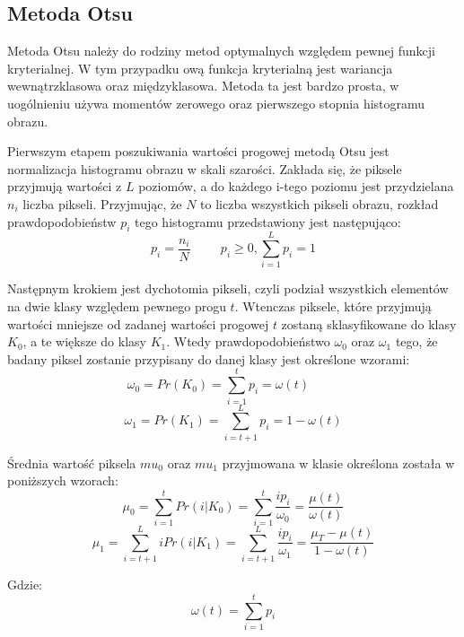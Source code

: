 \documentclass[eng,oneside]{mgr}
\begin{document}
\subsection{Metoda Otsu} 
Metoda Otsu należy do rodziny metod optymalnych względem pewnej funkcji kryterialnej. W tym przypadku ową funkcja kryterialną jest wariancja wewnątrzklasowa oraz międzyklasowa. Metoda ta jest bardzo prosta, w uogólnieniu używa momentów zerowego oraz pierwszego stopnia histogramu obrazu.
\par Pierwszym etapem poszukiwania wartości progowej metodą Otsu jest normalizacja histogramu obrazu w skali szarości. Zakłada się, że piksele przyjmują wartości z $L$ poziomów, a do każdego i-tego poziomu jest przydzielana $n_i$ liczba pikseli. Przyjmując, że $N$ to liczba wszystkich pikseli obrazu, rozkład prawdopodobieństw $p_i$ tego histogramu przedstawiony jest następująco:
\begin{equation}
 p_i = \frac{n_i}{N} \hspace{1cm}
 p_i \geq 0, \sum_{i=1}^L p_i = 1 
\end{equation}
\par Następnym krokiem jest dychotomia pikseli, czyli podział wszystkich elementów na dwie klasy względem pewnego progu $t$. Wtenczas piksele, które przyjmują wartości mniejsze od zadanej wartości progowej $t$ zostaną sklasyfikowane do klasy $K_0$, a te większe do klasy $K_1$. Wtedy prawdopodobieństwo $\omega_0$ oraz $\omega_1$ tego, że badany piksel zostanie przypisany do danej klasy jest określone wzorami:
\begin{equation}
\omega_0 = Pr(K_0)=\sum_{i=1}^t p_i = \omega(t)\hspace{1cm}
\end{equation}
\begin{equation}
\omega_1 = Pr(K_1)=\sum_{i=t+1}^L p_i = 1 - \omega(t)
\end{equation}
\par Średnia wartość piksela $mu_0$ oraz $mu_1$ przyjmowana w klasie określona została w poniższych wzorach:
\begin{equation}
\mu_0=\sum_{i=1}^t Pr(i|K_0)=\sum_{i=1}^t \frac{ip_i}{\omega_0}=\frac{\mu(t)}{\omega(t)}
\end{equation}
\begin{equation}
\mu_1=\sum_{i=t+1}^L iPr(i|K_1)=\sum_{i=t+1}^L \frac{ip_i}{\omega_1} = \frac{\mu_T-\mu(t)}{1-\omega(t)}
\end{equation}
\par Gdzie:
\begin{equation}
\omega(t)=\sum_{i=1}^t p_i
\end{equation}
\end{document}
